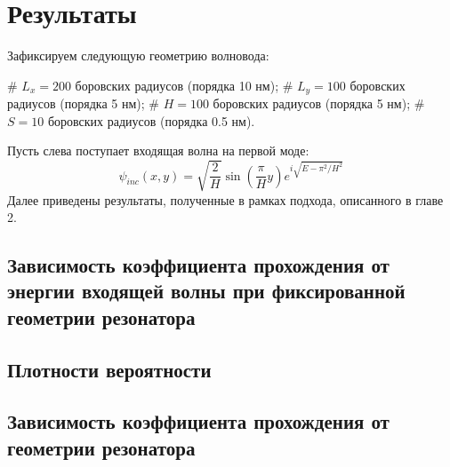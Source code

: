 \chapter{Результаты} 
\label{chapter3}


Зафиксируем следующую геометрию волновода:
\begin{ilist}
# $L_x = 200$ боровских радиусов (порядка 10 нм);
# $L_y = 100$ боровских радиусов (порядка 5 нм);
# $H = 100$ боровских радиусов (порядка 5 нм);
# $S = 10$ боровских радиусов (порядка 0.5 нм).
\end{ilist}
Пусть слева поступает входящая волна на первой моде:
\[
\psi_{inc}(x, y) = \sqrt{\frac{2}{H}} \sin(\frac{\pi}{H} y) e^{i \sqrt{E - \pi^2 / H^2}}
\]
Далее приведены результаты, полученные в рамках подхода, описанного в главе 2.
\section{Зависимость коэффициента прохождения от энергии входящей волны при фиксированной геометрии резонатора}

\section{Плотности вероятности}

\section{Зависимость коэффициента прохождения от геометрии резонатора}